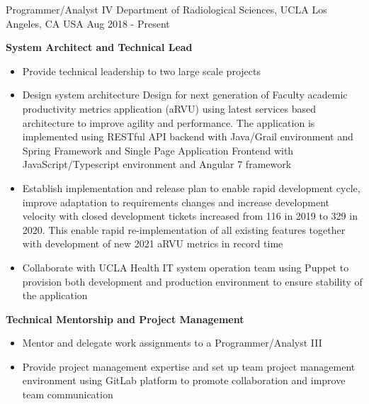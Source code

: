 


\begin{cventries}


	
  \cventry
    {Programmer/Analyst IV} %
    {Department of Radiological Sciences, UCLA} %
    {Los Angeles, CA USA} %
    {Aug 2018 - Present} %
    {
      \begin{cvitems} %
        \item[] { {\bf System Architect and Technical Lead}
            \begin{itemize} %
                \item {Provide technical leadership to two large scale projects}
                \item {Design system architecture Design for next generation of Faculty academic productivity metrics application (aRVU) using latest services based architecture to improve agility and performance. The application is implemented using RESTful API backend with Java/Grail environment and Spring Framework and Single Page Application Frontend with JavaScript/Typescript environment and Angular 7 framework}
                \item {Establish implementation and release plan to enable rapid development cycle, improve adaptation to requirements changes and increase development velocity with closed development tickets increased from 116 in 2019 to 329 in 2020. This enable rapid re-implementation of all existing features together with development of new 2021 aRVU metrics in record time}
                \item {Collaborate with UCLA Health IT system operation team using Puppet to provision both development and production environment to ensure stability of the application}
              \end{itemize}}
        \item[] { {\bf Technical Mentorship and Project Management} 
            \begin{itemize} %
                \item {Mentor and delegate work assignments to a Programmer/Analyst III}
                \item {Provide project management expertise and set up team project management environment using GitLab platform to promote collaboration and improve team communication}
              \end{itemize}}
      \end{cvitems}
    }



\end{cventries}
